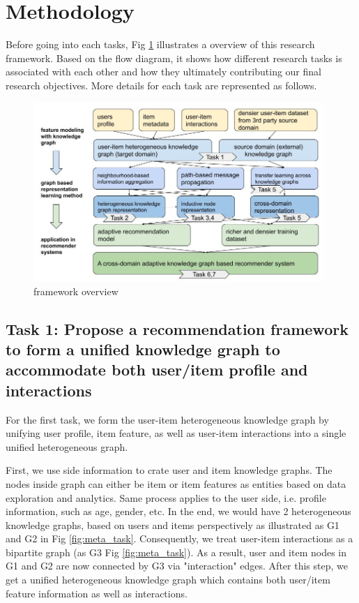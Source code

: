 \section{Methodology}

Before going into each tasks, Fig \ref{fig:framework} illustrates a overview of this research framework. Based on the flow diagram, it shows how different research tasks is associated with each other and how they ultimately contributing our final research objectives. More details for each task are represented as follows.

\begin{figure}[!ht]
    \centering
    \includegraphics[width=0.98\textwidth]{figs/framework_overview.jpg}
    \caption{framework overview}\label{fig:framework}
\end{figure}

\subsection*{Task 1: Propose a recommendation framework to form a unified knowledge graph to accommodate both user/item profile and interactions}

For the first task, we form the user-item heterogeneous knowledge graph by unifying user profile, item feature, as well as user-item interactions into a single unified heterogeneous graph.

First, we use side information to crate user and item knowledge graphs. The nodes inside graph can either be item or item features as entities based on data exploration and analytics. Same process applies to the user side, i.e. profile information, such as age, gender, etc. In the end, we would have 2 heterogeneous knowledge graphs, based on users and items perspectively as illustrated as G1 and G2 in Fig \ref{fig:meta_task}.
Consequently, we treat user-item interactions as a bipartite graph (as G3 Fig \ref{fig:meta_task}). As a result, user and item nodes in G1 and G2 are now connected by G3 via "interaction" edges. After this step, we get a unified heterogeneous knowledge graph which contains both user/item feature information as well as interactions.


